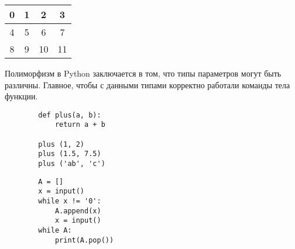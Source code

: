 \documentclass[a4paper, fleqn]{article}
\begin{document}
	\begin{tabular}{|c|c|c|c|}
		\hline \rule[-2ex]{0pt}{5.5ex}  0&  1&  2&  3\\ 
		\hline \rule[-2ex]{0pt}{5.5ex}  4&  5&  6&  7\\ 
		\hline \rule[-2ex]{0pt}{5.5ex}  8&  9&  10&  11\\ 
		\hline 
	\end{tabular}
	
	Полиморфизм в Python заключается в том, что типы параметров могут быть различны. Главное, чтобы с данными типами корректно работали команды тела функции.
	\begin{lstlisting}
		def plus(a, b):
			return a + b
		
		plus (1, 2)
		plus (1.5, 7.5)
		plus ('ab', 'c')
	\end{lstlisting}
	
	\begin{lstlisting}
		A = []
		x = input()
		while x != '0':
			A.append(x)
			x = input()
		while A:
			print(A.pop())
	\end{lstlisting}
	
		
	\subsection*{}
	
	
	\subsection*{}
	
	
	\subsection*{}
	
	
	\subsection*{}
	
\end{document}

